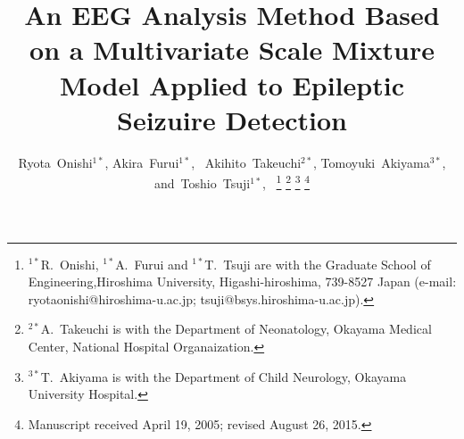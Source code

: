 \documentclass[journal]{IEEEtran}
\begin{document}
%
\title{An EEG Analysis Method Based on a Multivariate Scale Mixture Model Applied to Epileptic Seizuire Detection}
%
%
%

\author{Ryota~Onishi${}^{1*}$,
        Akira~Furui${}^{1*}$,~
        Akihito~Takeuchi${}^{2*}$,
        Tomoyuki~Akiyama${}^{3*}$,
        and~Toshio~Tsuji${}^{1*}$,~%
\thanks{${}^{1*}$R.~Onishi, ${}^{1*}$A.~Furui and ${}^{1*}$T.~Tsuji are with the Graduate School of Engineering,Hiroshima University, Higashi-hiroshima, 739-8527 Japan (e-mail: ryotaonishi@hiroshima-u.ac.jp; tsuji@bsys.hiroshima-u.ac.jp).}%
\thanks{${}^{2*}$A.~Takeuchi is with the Department of Neonatology, Okayama Medical Center, National Hospital Organaization.}
\thanks{${}^{3*}$T.~Akiyama is with the Department of Child Neurology, Okayama University Hospital.}%
\thanks{Manuscript received April 19, 2005; revised August 26, 2015.}}
\end{document}
